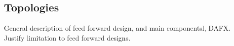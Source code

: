 \documentclass[../main2.tex]{subfiles}
\begin{document}
\subsection{Topologies}
General description of feed forward design, and main componentsl, DAFX. Justify limitation to feed forward designs.
\end{document}
